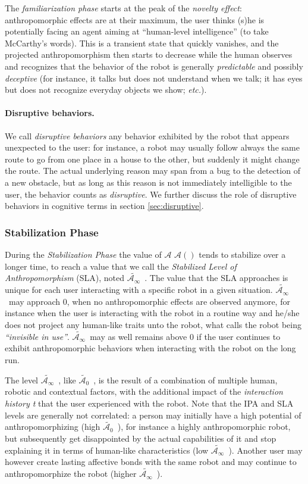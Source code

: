 \documentclass{frontiersSCNS} %
\newcommand{\etc}{\textit{etc.}\xspace}
\newcommand{\Ant}[1][]{%
      \ifthenelse{\isempty{#1}}%
        {$\mathcal{A}$}
        {$\mathcal{A}(#1)$}
}
\newcommand{\IPAe}{{$\widetilde{\mathcal{A}_0}$~}}
\newcommand{\SLAe}{{$\widetilde{\mathcal{A}_\infty}$~}}
\begin{document}
The \emph{familiarization phase} starts at the peak of the \emph{novelty
effect}: anthropomorphic effects are at their maximum, the user thinks (s)he is
potentially facing an agent aiming at ``human-level intelligence'' (to take
McCarthy's words). This is a transient state that quickly vanishes, and the
projected anthropomorphism then starts to decrease while the human observes and
recognizes that the behavior of the robot is generally \emph{predictable} and
possibly \emph{deceptive} (for instance, it talks but does not understand when
we talk; it has eyes but does not recognize everyday objects we show; \etc).

\paragraph{Disruptive behaviors.}

We call \emph{disruptive behaviors} any behavior exhibited by the robot that
appears unexpected to the user: for instance, a robot may usually follow always
the same route to go from one place in a house to the other, but suddenly it
might change the route. The actual underlying reason may span from a bug to the
detection of a new obstacle, but as long as this reason is not immediately
intelligible to the user, the behavior counts as \emph{disruptive}. We further
discuss the role of disruptive behaviors in cognitive terms in section
\ref{sec:disruptive}.


\subsubsection{Stabilization Phase\\}

During the \textit{Stabilization Phase} the value of \Ant tends to stabilize over
a longer time, to reach a value that we call the \textit{Stabilized Level of
Anthropomorphism} (SLA), noted \SLAe. The value that the
SLA approaches is unique for each user interacting with a specific robot in a
given situation. \SLAe may approach $0$, when no anthropomorphic effects
are observed anymore, for instance when the user is interacting with the robot
in a routine way and he/she does not project any human-like traits unto the
robot, what \cite{takayama_toward_2011} calls the robot being
\textit{``invisible in use''}. \SLAe may as well remains above 0 if the user
continues to exhibit anthropomorphic behaviors when interacting with the robot
on the long run.

The level \SLAe, like \IPAe, is the result of a combination of multiple human,
robotic and contextual factors, with the additional impact of the
\emph{interaction history t} that the user experienced with the robot. Note that
the IPA and SLA levels are generally not correlated: a person may initially
have a high potential of anthropomorphizing (high \IPAe), for instance a highly
anthropomorphic robot, but subsequently get disappointed by the actual
capabilities of it and stop explaining it in terms of human-like characteristics
(low \SLAe). Another user may however create lasting affective bonds with the
same robot and may continue to anthropomorphize the robot (higher \SLAe).
\end{document}
